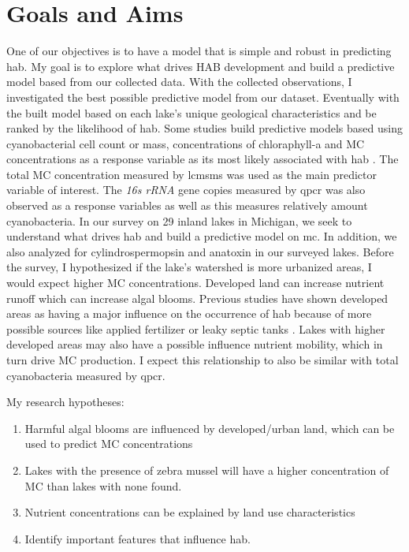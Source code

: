  \section{Goals and Aims}
 One of our objectives is to have a model that is simple and robust in predicting \gls{hab}.  
My goal is to explore what drives HAB development and build a predictive model based from our collected data.  With the collected observations, I investigated the best possible predictive model from our dataset. Eventually with the built model based on each lake's unique geological characteristics and be ranked by the likelihood of \gls{hab}.
Some studies build predictive models based using cyanobacterial cell count or mass, concentrations of chloraphyll-a and MC concentrations as a response variable as its most likely associated with \gls{hab} \cite{moore_richard_cyanobacterial_1993, ahn_evaluation_2011, jiang_statistical_2008, beaulieu_nutrients_2013, taranu_predicting_2017}.
The total MC concentration measured by \gls{lcmsms} was used as the main predictor variable of interest. The \emph{16s rRNA} gene copies measured by \gls{qpcr} was also observed as a response variables as well as this measures relatively amount cyanobacteria. In our survey on 29 inland lakes in Michigan, we seek to understand what drives \gls{hab} and build a predictive model on \gls{mc}. In addition, we also analyzed for cylindrospermopsin and anatoxin in our surveyed lakes. Before the survey, I hypothesized if the lake's watershed is more urbanized areas, I would expect higher MC concentrations. Developed land can increase nutrient runoff which can increase algal blooms. Previous studies have shown developed areas as having a major influence on the occurrence of \gls{hab} because of more possible sources like applied fertilizer or leaky septic tanks \cite{beaver_land_2014, anderson_harmful_2002}. Lakes with higher developed areas may also have a possible influence nutrient mobility, which in turn drive MC production. I expect this relationship to also be similar with total cyanobacteria measured by \gls{qpcr}. 

My research hypotheses:

\begin{enumerate}
 \item Harmful algal blooms are influenced by  developed/urban land, which can be used to predict MC concentrations
 \item Lakes with the presence of zebra mussel will have a higher concentration of MC than lakes with none found.
 \item Nutrient concentrations can be explained by land use characteristics
 \item Identify important features that influence \gls{hab}.

\end{enumerate}
